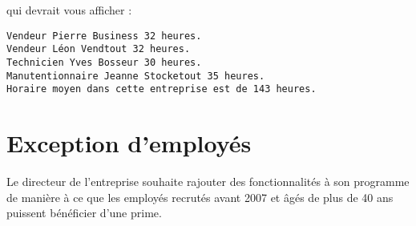 qui devrait vous afficher :

\begin{lstlisting}
Vendeur Pierre Business 32 heures.
Vendeur Léon Vendtout 32 heures.
Technicien Yves Bosseur 30 heures.
Manutentionnaire Jeanne Stocketout 35 heures.
Horaire moyen dans cette entreprise est de 143 heures.
\end{lstlisting}

\section{Exception d’employés}

Le directeur de l'entreprise souhaite rajouter des fonctionnalités à son programme de manière à ce que les employés recrutés avant 2007 et âgés de plus de 40 ans puissent bénéficier d'une prime.










